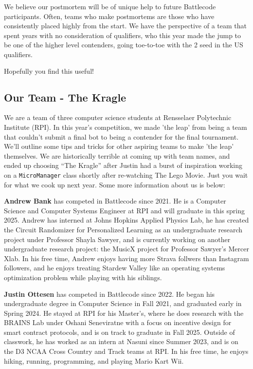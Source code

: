 We believe our postmortem will be of unique help to future Battlecode participants. Often, teams who make postmortems are those who have consistently placed highly from the start. We have the perspective of a team that spent years with no consideration of qualifiers, who this year made the jump to be one of the higher level contenders, going toe-to-toe with the 2 seed in the US qualifiers.

  \medskip

  Hopefully you find this useful!

  \subsection{Our Team - The Kragle}

  We are a team of three computer science students at Rensselaer Polytechnic Institute (RPI). In this year's competition, we made 'the leap' from being a team that couldn't submit a final bot to being a contender for the final tournament. We'll outline some tips and tricks for other aspiring teams to make 'the leap' themselves. We are historically terrible at coming up with team names, and ended up choosing ``The Kragle'' after Justin had a burst of inspiration working on a \verb|MicroManager| class shortly after re-watching The Lego Movie. Just you wait for what we cook up next year. Some more information about us is below:
  
  \medskip

  \textbf{Andrew Bank} has competed in Battlecode since 2021. He is a Computer Science and Computer Systems Engineer at RPI and will graduate in this spring 2025. Andrew has interned at Johns Hopkins Applied Physics Lab, he has created the Circuit Randomizer for Personalized Learning as an undergraduate research project under Professor Shayla Sawyer, and is currently working on another undergraduate research project: the MusicX project for Professor Sawyer's Mercer Xlab. In his free time, Andrew enjoys having more Strava follwers than Instagram followers, and he enjoys treating Stardew Valley like an operating systems optimization problem while playing with his siblings.

  \medskip

  \textbf{Justin Ottesen} has competed in Battlecode since 2022. He began his undergraduate degree in Computer Science in Fall 2021, and graduated early in Spring 2024. He stayed at RPI for his Master's, where he does research with the BRAINS Lab under Oshani Seneviratne with a focus on incentive design for smart contract protocols, and is on track to graduate in Fall 2025. Outside of classwork, he has worked as an intern at Nasuni since Summer 2023, and is on the D3 NCAA Cross Country and Track teams at RPI. In his free time, he enjoys hiking, running, programming, and playing Mario Kart Wii.

